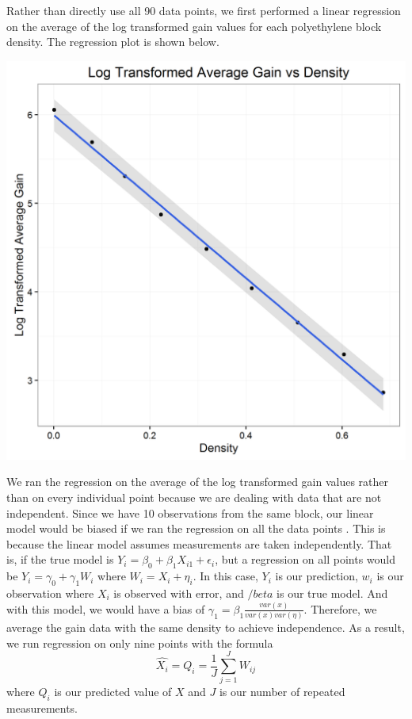 \documentclass[11pt]{article} %
\begin{document}
Rather than directly use all 90 data points, we first performed a linear regression on the average of the log transformed gain values for each polyethylene block density. The regression plot is shown below.
\begin{center}\includegraphics[scale=0.6]{logGainDensity.png}\end{center}

We ran the regression on the average of the log transformed gain values rather than on every individual point because we are dealing with data that are not independent. Since we have 10 observations from the same block, our linear model would be biased if we ran the regression on all the data points . This is because the linear model assumes measurements are taken independently. That is, if the true model is $Y_i=\beta_0 +\beta_1X_{i1}+\epsilon_i$, but a regression on all points would be $Y_i=\gamma_0+\gamma_1W_i$ where $W_i=X_i+\eta_i$. In this case, $Y_i$ is our prediction, $w_i$ is our observation where $X_i$ is observed with error, and $/beta$ is our true model. And with this model, we would have a bias of $\gamma_1=\beta_1\frac{var(x)}{var(x)var(\eta)}$. Therefore, we average the gain data with the same density to achieve independence. As a result, we run regression on only nine points with the formula $$\hat{X_i}=Q_i=\frac{1}{J}\sum_{j=1}^{J}W_{ij}$$ where $Q_i$ is our predicted value of $X$ and $J$ is our number of repeated measurements.
\end{document}
